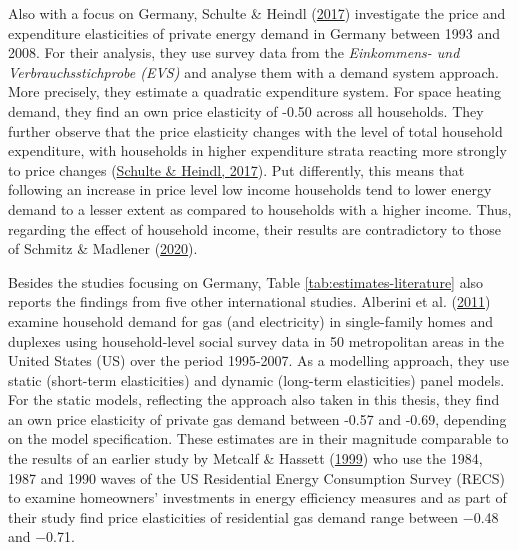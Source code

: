 \documentclass[12pt,twoside]{reedthesis}
\begin{document}
Also with a focus on Germany, Schulte \& Heindl (\protect\hyperlink{ref-schulte_heindl17}{2017}) investigate the price and expenditure elasticities of private energy demand in Germany between 1993 and 2008. For their analysis, they use survey data from the \emph{Einkommens- und Verbrauchsstichprobe (EVS)} and analyse them with a demand system approach. More precisely, they estimate a quadratic expenditure system. For space heating demand, they find an own price elasticity of -0.50 across all households. They further observe that the price elasticity changes with the level of total household expenditure, with households in higher expenditure strata reacting more strongly to price changes (\protect\hyperlink{ref-schulte_heindl17}{Schulte \& Heindl, 2017}). Put differently, this means that following an increase in price level low income households tend to lower energy demand to a lesser extent as compared to households with a higher income. Thus, regarding the effect of household income, their results are contradictory to those of Schmitz \& Madlener (\protect\hyperlink{ref-schmitz_madlener20}{2020}).

Besides the studies focusing on Germany, Table \ref{tab:estimates-literature} also reports the findings from five other international studies. Alberini et al. (\protect\hyperlink{ref-alberini_etal11}{2011}) examine household demand for gas (and electricity) in single-family homes and duplexes using household-level social survey data in 50 metropolitan areas in the United States (US) over the period 1995-2007. As a modelling approach, they use static (short-term elasticities) and dynamic (long-term elasticities) panel models. For the static models, reflecting the approach also taken in this thesis, they find an own price elasticity of private gas demand between -0.57 and -0.69, depending on the model specification. These estimates are in their magnitude comparable to the results of an earlier study by Metcalf \& Hassett (\protect\hyperlink{ref-metcalf_hassett99}{1999}) who use the 1984, 1987 and 1990 waves of the US Residential Energy Consumption Survey (RECS) to examine homeowners' investments in energy efficiency measures and as part of their study find price elasticities of residential gas demand range between −0.48 and −0.71.
\end{document}
